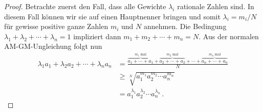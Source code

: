 \begin{proof}
	Betrachte zuerst den Fall, dass alle Gewichte $\lambda_i$ rationale Zahlen sind. In diesem Fall können wir sie auf einen Hauptnenner bringen und somit $\lambda_i=m_i/N$ für gewisse positive ganze Zahlen $m_i$ und $N$ annehmen. Die Bedingung $\lambda_1+\lambda_2+\dotsb+\lambda_n=1$ impliziert dann $m_1+m_2+\dotsb+m_n=N$. Aus der normalen AM-GM-Ungleichung folgt nun
	\begin{align*}
		\lambda_1 a_1+\lambda_2 a_2+\dotsb+\lambda_na_n&=\frac{\overbrace{a_1+\dotsb+a_1}^{m_1\text{ mal}}+\overbrace{a_2+\dotsb+a_2}^{m_2\text{ mal}}+\dotsb+\overbrace{a_n+\dotsb+a_n}^{m_n\text{ mal}}}{N}\\
		&\geqslant \sqrt[N]{a_1^{m_1}a_2^{m_2}\dotsm a_n^{m_n}}\\
		&=a_1^{\lambda_1}a_2^{\lambda_2}\dotsm a_n^{\lambda_n}\,.
	\end{align*}
	

\end{proof}
